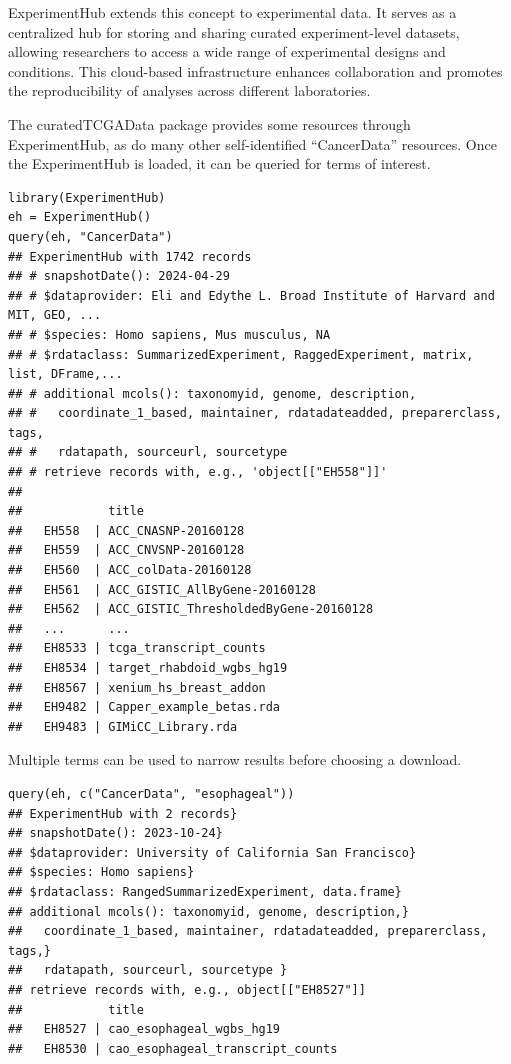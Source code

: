 \documentclass[graybox]{svmult}
\begin{document}
ExperimentHub extends this concept to experimental data. It serves as a
centralized hub for storing and sharing curated experiment-level datasets,
allowing researchers to access a wide range of experimental designs and
conditions. This cloud-based infrastructure enhances collaboration and promotes
the reproducibility of analyses across different laboratories.

The curatedTCGAData package provides some resources through
ExperimentHub, as do many other self-identified ``CancerData'' resources. Once the
ExperimentHub is loaded, it can be queried for terms of interest.

\begin{shaded}
\begin{verbatim}
library(ExperimentHub)
eh = ExperimentHub()
query(eh, "CancerData")
## ExperimentHub with 1742 records
## # snapshotDate(): 2024-04-29
## # $dataprovider: Eli and Edythe L. Broad Institute of Harvard and MIT, GEO, ...
## # $species: Homo sapiens, Mus musculus, NA
## # $rdataclass: SummarizedExperiment, RaggedExperiment, matrix, list, DFrame,...
## # additional mcols(): taxonomyid, genome, description,
## #   coordinate_1_based, maintainer, rdatadateadded, preparerclass, tags,
## #   rdatapath, sourceurl, sourcetype 
## # retrieve records with, e.g., 'object[["EH558"]]' 
## 
##            title                                
##   EH558  | ACC_CNASNP-20160128                  
##   EH559  | ACC_CNVSNP-20160128                  
##   EH560  | ACC_colData-20160128                 
##   EH561  | ACC_GISTIC_AllByGene-20160128        
##   EH562  | ACC_GISTIC_ThresholdedByGene-20160128
##   ...      ...                                  
##   EH8533 | tcga_transcript_counts               
##   EH8534 | target_rhabdoid_wgbs_hg19            
##   EH8567 | xenium_hs_breast_addon               
##   EH9482 | Capper_example_betas.rda             
##   EH9483 | GIMiCC_Library.rda    
\end{verbatim}
\end{shaded}


Multiple terms can be used to narrow results before choosing a download.

\begin{shaded}
\begin{verbatim}
query(eh, c("CancerData", "esophageal"))
## ExperimentHub with 2 records}
## snapshotDate(): 2023-10-24}
## $dataprovider: University of California San Francisco}
## $species: Homo sapiens}
## $rdataclass: RangedSummarizedExperiment, data.frame}
## additional mcols(): taxonomyid, genome, description,}
##   coordinate_1_based, maintainer, rdatadateadded, preparerclass, tags,}
##   rdatapath, sourceurl, sourcetype }
## retrieve records with, e.g., object[["EH8527"]]
##            title                           
##   EH8527 | cao_esophageal_wgbs_hg19        
##   EH8530 | cao_esophageal_transcript_counts
\end{verbatim}
\end{shaded}
\end{document}
